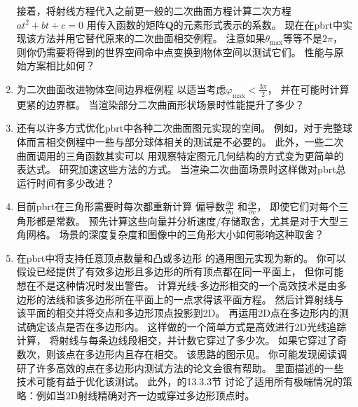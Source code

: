 \begin{enumerate}
          接着，将射线方程代入之前更一般的二次曲面方程计算二次方程$at^2+bt+c=0$
          用传入函数的矩阵$\bm Q$的元素形式表示的系数。
          现在在pbrt中实现该方法并用它替代原来的二次曲面相交例程。
          注意如果$\theta_{\max}$等等不是$2\pi$，
          则你仍需要将得到的世界空间命中点变换到物体空间以测试它们。
          性能与原始方案相比如何？
    \item \circleone 为二次曲面改进物体空间边界框例程
          以适当考虑$\displaystyle\varphi_{\max}<\frac{3\pi}{2}$，
          并在可能时计算更紧的边界框。
          当渲染部分二次曲面形状场景时性能提升了多少？
    \item \circletwo 还有以许多方式优化pbrt中各种二次曲面图元实现的空间。
          例如，对于完整球体而言相交例程中一些与部分球体相关的测试是不必要的。
          此外，一些二次曲面调用的三角函数其实可以
          用观察特定图元几何结构的方式变为更简单的表达式。
          研究加速这些方法的方式。
          当渲染二次曲面场景时这样做对pbrt总运行时间有多少改进？
    \item \circleone 目前pbrt在三角形需要时每次都重新计算
          偏导数$\displaystyle\frac{\partial \bm p}{\partial u}$
          和$\displaystyle\frac{\partial \bm p}{\partial v}$，
          即使它们对每个三角形都是常数。
          预先计算这些向量并分析速度/存储取舍，尤其是对于大型三角网格。
          场景的深度复杂度和图像中的三角形大小如何影响这种取舍？
    \item \circletwo 在pbrt中将支持任意顶点数量和凸或多边形
          的通用图元实现为新的。
          你可以假设已经提供了有效多边形且多边形的所有顶点都在同一平面上，
          但你可能想在不是这种情况时发出警告。
          计算光线-多边形相交的一个高效技术是由多边形的法线和该多边形所在平面上的一点求得该平面方程。
          然后计算射线与该平面的相交并将交点和多边形顶点投影到2D。
          再运用2D点在多边形内的测试确定该点是否在多边形内。
          这样做的一个简单方式是高效进行2D光线追踪计算，
          将射线与每条边线段相交，并计数它穿过了多少次。
          如果它穿过了奇数次，则该点在多边形内且存在相交。
          该思路的图示见。
          你可能发现阅读\citet{HAINES199424}调研了许多高效的点在多边形内测试方法的论文会很有帮助。
          里面描述的一些技术可能有益于优化该测试。
          此外，\citet{10.5555/2821579}的13.3.3节
          讨论了适用所有极端情况的策略：例如当2D射线精确对齐一边或穿过多边形顶点时。
          \begin{figure}[htbp]
              \centering

\end{figure}
\end{enumerate}
